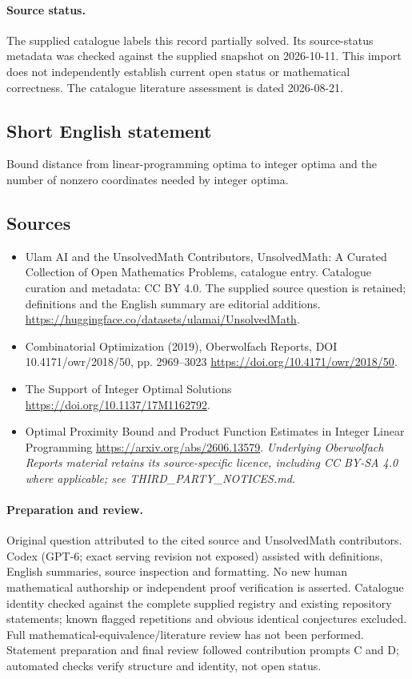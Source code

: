 \documentclass[11pt]{article}
\begin{document}
\paragraph{Source status.}
The supplied catalogue labels this record partially solved. Its source-status metadata was checked against the supplied snapshot on 2026-10-11. This import does not independently establish current open status or mathematical correctness. The catalogue literature assessment is dated 2026-08-21.
\subsection{Short English statement}
Bound distance from linear-programming optima to integer optima and the number of nonzero coordinates needed by integer optima.
\subsection{Sources}
\begin{itemize}
\item[\hypertarget{source:statement:1}{S1}] Ulam AI and the UnsolvedMath Contributors, UnsolvedMath: A Curated Collection of Open Mathematics Problems, catalogue entry. Catalogue curation and metadata: CC BY 4.0. The supplied source question is retained; definitions and the English summary are editorial additions.
\url{https://huggingface.co/datasets/ulamai/UnsolvedMath}.
\item[\hypertarget{source:statement:2}{S2}] Combinatorial Optimization (2019), Oberwolfach Reports, DOI 10.4171/owr/2018/50, pp. 2969--3023
\url{https://doi.org/10.4171/owr/2018/50}.
\item[\hypertarget{source:statement:3}{S3}] The Support of Integer Optimal Solutions
\url{https://doi.org/10.1137/17M1162792}.
\item[\hypertarget{source:statement:4}{S4}] Optimal Proximity Bound and Product Function Estimates in Integer Linear Programming
\url{https://arxiv.org/abs/2606.13579}.
\textit{Underlying Oberwolfach Reports material retains its source-specific licence, including CC BY-SA 4.0 where applicable; see THIRD\_PARTY\_NOTICES.md.}
\end{itemize}
\paragraph{Preparation and review.}
Original question attributed to the cited source and UnsolvedMath contributors. Codex (GPT-6; exact serving revision not exposed) assisted with definitions, English summaries, source inspection and formatting. No new human mathematical authorship or independent proof verification is asserted. Catalogue identity checked against the complete supplied registry and existing repository statements; known flagged repetitions and obvious identical conjectures excluded. Full mathematical-equivalence/literature review has not been performed. Statement preparation and final review followed contribution prompts C and D; automated checks verify structure and identity, not open status.
\label{end:statement}
\end{document}
